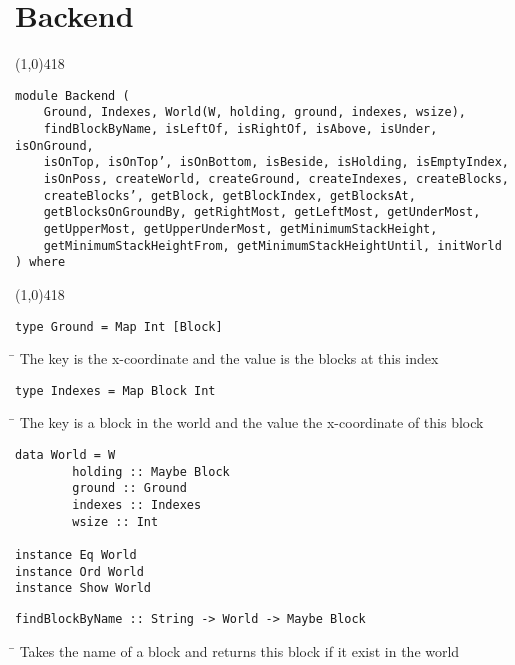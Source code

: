 \section{Backend}
\begin{center}
\line(1,0){418}
\end{center}
\begin{verbatim}
module Backend (
    Ground, Indexes, World(W, holding, ground, indexes, wsize),
    findBlockByName, isLeftOf, isRightOf, isAbove, isUnder, isOnGround,
    isOnTop, isOnTop’, isOnBottom, isBeside, isHolding, isEmptyIndex,
    isOnPoss, createWorld, createGround, createIndexes, createBlocks,
    createBlocks’, getBlock, getBlockIndex, getBlocksAt,
    getBlocksOnGroundBy, getRightMost, getLeftMost, getUnderMost,
    getUpperMost, getUpperUnderMost, getMinimumStackHeight,
    getMinimumStackHeightFrom, getMinimumStackHeightUntil, initWorld
) where
\end{verbatim}
\begin{center}
\line(1,0){418}
\end{center}
\begin{verbatim}
type Ground = Map Int [Block]
\end{verbatim}
\begin{tabbing}
\hspace*{1cm}\= \kill
\> The key is the x-coordinate and the value is the blocks at this index
\end{tabbing}
\begin{verbatim}
type Indexes = Map Block Int
\end{verbatim}
\begin{tabbing}
\hspace*{1cm}\= \kill
\> The key is a block in the world and the value the x-coordinate of this block
\end{tabbing}
\begin{verbatim}
data World = W 
        holding :: Maybe Block
        ground :: Ground
        indexes :: Indexes
        wsize :: Int

instance Eq World
instance Ord World
instance Show World
\end{verbatim}
\begin{verbatim}
findBlockByName :: String -> World -> Maybe Block
\end{verbatim}
\begin{tabbing}
\hspace*{1cm}\= \kill
\> Takes the name of a block and returns this block if it exist in the world
\end{tabbing}
